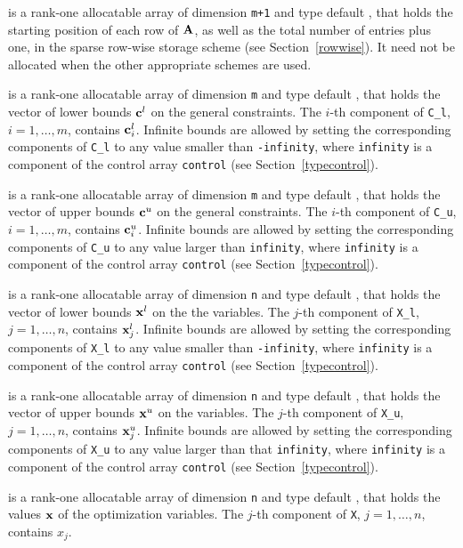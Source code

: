 \documentclass{galahad}
\begin{document}
\begin{description}
\begin{description}
 is a rank-one allocatable array of dimension {\tt m+1} and type
default \integer, that holds the
starting position of each row of ${\mathbf{A}}$, as well
as the total number of entries plus one, in the sparse row-wise storage
scheme (see Section~\ref{rowwise}). It need not be allocated when the
other appropriate schemes are used.

\end{description}

 is a rank-one allocatable array of dimension {\tt m} and type
default \realdp, that holds the vector of lower bounds ${\mathbf{c}}^{l}$
on the general constraints. The $i$-th component of
{\tt C\_l}, $i = 1, \ldots , m$, contains ${\mathbf{c}}_{i}^{l}$.
Infinite bounds are allowed by setting the corresponding
components of {\tt C\_l} to any value smaller than {\tt -infinity},
where {\tt infinity} is a component of the control array {\tt control}
(see Section~\ref{typecontrol}).

 is a rank-one allocatable array of dimension {\tt m} and type
default \realdp, that holds the vector of upper bounds ${\mathbf{c}}^{u}$
on the general constraints. The $i$-th component of
{\tt C\_u}, $i = 1,  \ldots ,  m$, contains ${\mathbf{c}}_{i}^{u}$.
Infinite bounds are allowed by setting the corresponding
components of {\tt C\_u} to any value larger than {\tt infinity},
where {\tt infinity} is a component of the control array {\tt control}
(see Section~\ref{typecontrol}).

 is a rank-one allocatable array of dimension {\tt n} and type
default \realdp, that holds
the vector of lower bounds ${\mathbf{x}}^{l}$ on the the variables.
The $j$-th component of {\tt X\_l}, $j = 1, \ldots , n$,
contains ${\mathbf{x}}_{j}^{l}$.
Infinite bounds are allowed by setting the corresponding
components of {\tt X\_l} to any value smaller than {\tt -infinity},
where {\tt infinity} is a component of the control array {\tt control}
(see Section~\ref{typecontrol}).

 is a rank-one allocatable array of dimension {\tt n} and type
default \realdp, that holds
the vector of upper bounds ${\mathbf{x}}^{u}$ on the variables.
The $j$-th component of {\tt X\_u}, $j = 1, \ldots , n$,
contains ${\mathbf{x}}_{j}^{u}$.
Infinite bounds are allowed by setting the corresponding
components of {\tt X\_u} to any value larger than that {\tt infinity},
where {\tt infinity} is a component of the control array {\tt control}
(see Section~\ref{typecontrol}).

 is a rank-one allocatable array of dimension {\tt n} and type
default \realdp,
that holds the values ${\mathbf{x}}$ of the optimization variables.
The $j$-th component of {\tt X}, $j = 1,  \ldots , n$, contains $x_{j}$.


\end{description}
\end{document}
